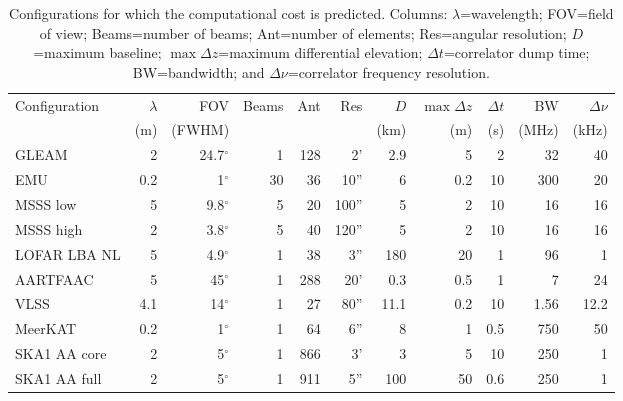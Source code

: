 \documentclass[useAMS,usenatbib]{mn2e}
\newcommand{\degree}{\ensuremath{^{\circ}}\xspace}
\begin{document}
\begin{table}
\caption{Configurations for which the computational cost is predicted. Columns: $\lambda$=wavelength; FOV=field of view; Beams=number of beams; Ant=number of elements; Res=angular resolution; $D$=maximum baseline; $\max \Delta z$=maximum differential elevation; $\Delta t$=correlator dump time; BW=bandwidth; and $\Delta \nu$=correlator frequency resolution.} \label{tbl:computational-cost-configurations}
\begin{tabular}{l|rrrrrrrrrr}
 Configuration&$\lambda$& FOV  & Beams & Ant & Res & $D$ & $\max \Delta z$ & $\Delta t$ & BW & $\Delta \nu$ \\
          & (m)       & (FWHM)&       &     &     & (km)                       & (m)             & (s)    & (MHz) &  (kHz) \\
\hline
 GLEAM    &  2   & 24.7\degree& 1    & 128 & 2'   & 2.9 & 5 & 2 & 32 & 40 \\
 EMU      & 0.2  & 1\degree   & 30   &  36 & 10''  & 6 & 0.2 &10 & 300 & 20\\
 MSSS low &  5   & 9.8\degree & 5    &  20 & 100'' & 5 & 2  &10 & 16 & 16 \\
 MSSS high&  2   & 3.8\degree & 5    &  40 & 120'' & 5 & 2  &10 & 16 & 16 \\
 LOFAR LBA NL& 5 & 4.9\degree & 1    &  38 &   3'' &180& 20 & 1 & 96 & 1 \\
 AARTFAAC &  5   & 45\degree  & 1    & 288 &  20'  & 0.3& 0.5 & 1 &  7 & 24 \\
 VLSS     & 4.1  & 14\degree  & 1    &  27 &  80'' &11.1& 0.2 &10 & 1.56 & 12.2 \\
 MeerKAT  & 0.2  &  1\degree  & 1    &  64 &   6'' &  8 & 1   & 0.5 & 750  & 50 \\
 SKA1 AA core&2  &  5\degree  & 1    & 866 &    3' &  3& 5 & 10 & 250 & 1 \\
 SKA1 AA full&2  &  5\degree  & 1    & 911 &   5'' &100& 50 & 0.6& 250 & 1 \\
\end{tabular}
\end{table}
\end{document}
